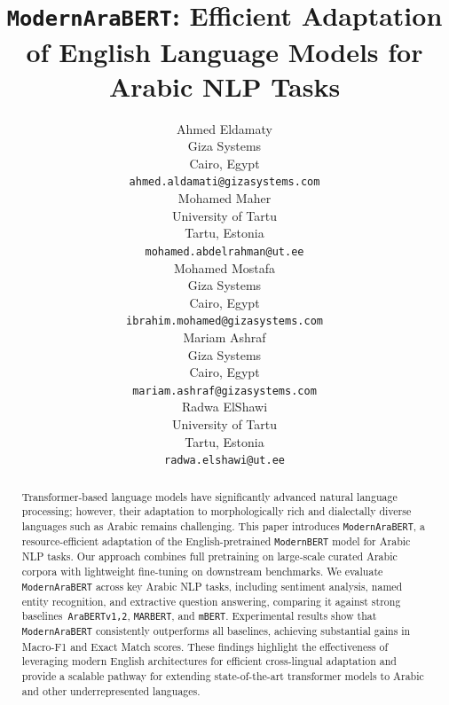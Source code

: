 \documentclass[11pt]{article}
\title{\texttt{ModernAraBERT}: Efficient Adaptation of English Language Models
for Arabic NLP Tasks}
\author{Ahmed Eldamaty \\
Giza Systems \\
Cairo, Egypt \\
\texttt{ahmed.aldamati@gizasystems.com} \\
\And Mohamed Maher \\
University of Tartu \\
Tartu, Estonia \\
\texttt{mohamed.abdelrahman@ut.ee} \\
\And Mohamed Mostafa \\
Giza Systems \\
Cairo, Egypt \\
\texttt{ibrahim.mohamed@gizasystems.com} \\
\And Mariam Ashraf \\
Giza Systems \\
Cairo, Egypt \\
\texttt{mariam.ashraf@gizasystems.com} \\
\And Radwa ElShawi \\
University of Tartu \\
Tartu, Estonia \\
\texttt{radwa.elshawi@ut.ee} \\}
\begin{document}
  \maketitle

 \begin{abstract}
    Transformer-based language models have significantly advanced natural language processing; however, their adaptation to morphologically rich and dialectally diverse languages such as Arabic remains challenging. This paper introduces \texttt{ModernAraBERT}, a resource-efficient adaptation of the English-pretrained \texttt{ModernBERT} model for Arabic NLP tasks. Our approach combines full pretraining on large-scale curated Arabic corpora with lightweight fine-tuning on downstream benchmarks. We evaluate \texttt{ModernAraBERT} across key Arabic NLP tasks, including sentiment analysis, named entity recognition, and extractive question answering, comparing it against strong baselines~\texttt{AraBERTv1,2}, \texttt{MARBERT}, and \texttt{mBERT}. Experimental results show that \texttt{ModernAraBERT} consistently outperforms all baselines, achieving substantial gains in Macro-F1 and Exact Match scores. These findings highlight the effectiveness of leveraging modern English architectures for efficient cross-lingual adaptation and provide a scalable pathway for extending state-of-the-art transformer models to Arabic and other underrepresented languages.
\end{abstract}
\end{document}
